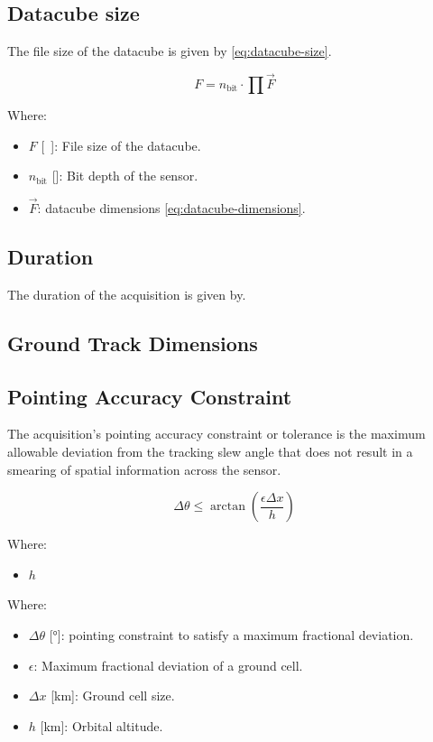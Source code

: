 \documentclass{article}
\begin{document}
\subsection{Datacube size}
The file size of the datacube is given by \eqref{eq:datacube-size}.

\begin{equation} \label{eq:datacube-size}
    F = n_{\text{bit}} \cdot \prod \vec{F}
\end{equation}

Where:
\begin{itemize}[label={}]
    \item $F$ [\si{\mega\byte}]: File size of the datacube. 
    \item $n_{\text{bit}}$ [\si{\bit}]: Bit depth of the sensor.
    \item $\vec{F}$: datacube dimensions \eqref{eq:datacube-dimensions}.
\end{itemize}



\subsection{Duration}
The duration of the acquisition is given by.


\subsection{Ground Track Dimensions}


\subsection{Pointing Accuracy Constraint}
The acquisition's pointing accuracy constraint or tolerance is the maximum allowable deviation from the tracking slew angle that does not result in a smearing of spatial information across the sensor. 

\begin{equation}
    \Delta\theta \leq \arctan\left(\frac{\epsilon \Delta x}{h}\right)
\end{equation}

Where:
\begin{itemize}[label={}]
    \item $h$
\end{itemize} 

Where:
\begin{itemize}[label={}]
    \item $\Delta\theta$ [\si{\degree}]: pointing constraint to satisfy a maximum fractional deviation.
    \item $\epsilon$: Maximum fractional deviation of a ground cell.
    \item $\Delta x$ [\si{\km}]: Ground cell size.
    \item $h$ [\si{\km}]: Orbital altitude.
\end{itemize}
\end{document}
